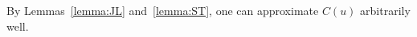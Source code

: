 \documentclass[journal]{IEEEtran}
\begin{document}

By Lemmas~\ref{lemma:JL} and~\ref{lemma:ST},  one can  approximate  \(C(u)\) arbitrarily well.
\end{document}
